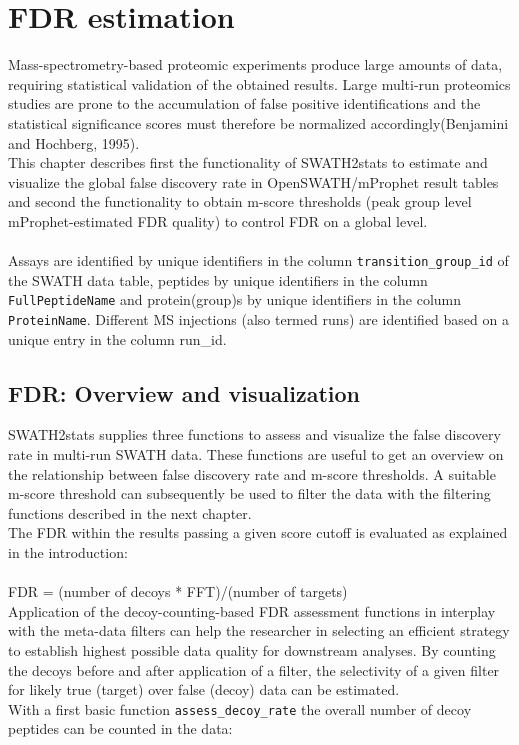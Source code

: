 \documentclass[a4paper]{article}
\begin{document}
\section{FDR estimation}
Mass-spectrometry-based proteomic experiments produce large amounts of data, requiring statistical validation of the obtained results. Large multi-run proteomics studies are prone to the accumulation of false positive identifications and the statistical significance scores must therefore be normalized accordingly(Benjamini and Hochberg, 1995).\\
This chapter describes first the functionality of SWATH2stats to estimate and visualize the global false discovery rate in OpenSWATH/mProphet result tables and second the functionality to obtain m-score thresholds (peak group level mProphet-estimated FDR quality) to control FDR on a global level.\\
\\
Assays are identified by unique identifiers in the column \texttt{transition\_group\_id} of the SWATH data table, peptides by unique identifiers in the column \texttt{\texttt{FullPeptideName}} and protein(group)s by unique identifiers in the column \texttt{ProteinName}. Different MS injections (also termed runs) are identified based on a unique entry in the column run\_id.


\subsection{FDR: Overview and visualization}
SWATH2stats supplies three functions to assess and visualize the false discovery rate in multi-run SWATH data. These functions are useful to get an overview on the relationship between false discovery rate and m-score thresholds. A suitable m-score threshold can subsequently be used to filter the data with the filtering functions described in the next chapter.\\
The FDR within the results passing a given score cutoff is evaluated as explained in the introduction:\\
\\
FDR = (number of decoys * FFT)/(number of targets)\\

Application of the decoy-counting-based FDR assessment functions in interplay with the meta-data filters can help the researcher in selecting an efficient strategy to establish highest possible data quality for downstream analyses. By counting the decoys before and after application of a filter, the selectivity of a given filter for likely true (target) over false (decoy) data can be estimated.\\
With a first basic function \texttt{assess\_decoy\_rate} the overall number of decoy peptides can be counted in the data:
\end{document}
